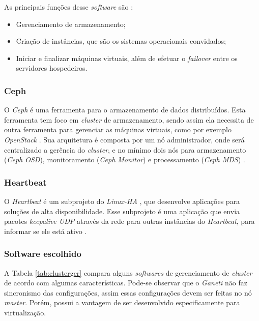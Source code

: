As principais funções desse \textit{software} são \cite{ganeti}:
\begin{itemize}
 \item Gerenciamento de armazenamento;
 \item Criação de instâncias, que são os sistemas operacionais convidados;
 \item Iniciar e finalizar máquinas virtuais, além de efetuar o \textit{failover} entre os servidores hospedeiros.
\end{itemize}


\subsubsection{Ceph}
\label{section:ceph}
O \textit{Ceph} \cite{ceph} é uma ferramenta para o armazenamento de dados distribuídos. Esta ferramenta tem foco em \textit{cluster} 
de armazenamento, sendo assim ela necessita de outra ferramenta para gerenciar as máquinas virtuais, como por exemplo \textit{OpenStack} 
\cite{openstack}. Sua arquitetura é composta por um nó administrador, onde será centralizado a gerência do \textit{cluster}, e no mínimo dois 
nós para armazenamento (\textit{Ceph OSD}), monitoramento (\textit{Ceph Monitor}) e processamento (\textit{Ceph MDS}) \cite{ceph}.

\subsubsection{Heartbeat}
\label{section:heartbeat}
O \textit{Heartbeat} é um subprojeto do \textit{Linux-HA} \cite{linuxha}, que desenvolve aplicações para soluções de alta disponibilidade.
Esse subprojeto é uma aplicação que envia pacotes \textit{keepalive \ac{UDP}} através da rede para outras instâncias do \textit{Heartbeat}, para
informar se ele está ativo \cite{reis2009}.

\subsubsection{Software escolhido}
\label{section:gerenciadorescolhido}

A Tabela \ref{tab:clusterger} compara alguns \textit{softwares} de gerenciamento de \textit{cluster} de acordo com algumas características. 
Pode-se observar que o \textit{Ganeti} não faz sincronismo das configurações, assim essas configurações devem ser feitas no nó \textit{master}.
Porém, possui a vantagem de ser desenvolvido especificamente para virtualização. 

